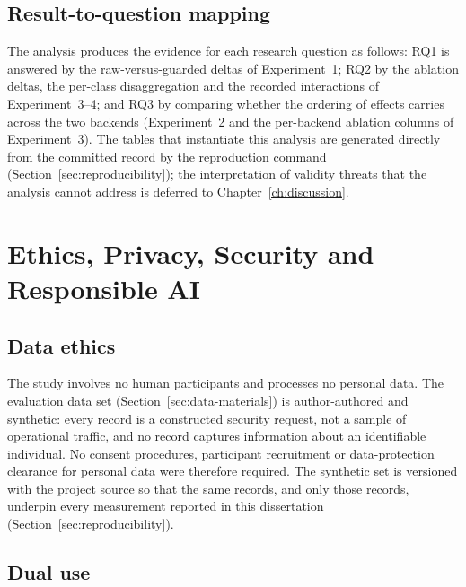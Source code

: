 \subsection*{Result-to-question mapping}

The analysis produces the evidence for each research question as follows: RQ1 is
answered by the raw-versus-guarded deltas of Experiment~1; RQ2 by the ablation
deltas, the per-class disaggregation and the recorded interactions of
Experiment~3--4; and RQ3 by comparing whether the ordering of effects carries
across the two backends (Experiment~2 and the per-backend ablation columns of
Experiment~3). The tables that instantiate this analysis are generated directly
from the committed record by the reproduction command
(Section~\ref{sec:reproducibility}); the interpretation of validity threats that
the analysis cannot address is deferred to Chapter~\ref{ch:discussion}.

\section{Ethics, Privacy, Security and Responsible AI}\label{sec:ethics}

\subsection*{Data ethics}

The study involves no human participants and processes no personal data. The
evaluation data set (Section~\ref{sec:data-materials}) is author-authored and
synthetic: every record is a constructed security request, not a sample of
operational traffic, and no record captures information about an identifiable
individual. No consent procedures, participant recruitment or data-protection
clearance for personal data were therefore required. The synthetic set is
versioned with the project source so that the same records, and only those
records, underpin every measurement reported in this dissertation
(Section~\ref{sec:reproducibility}).

\subsection*{Dual use}

